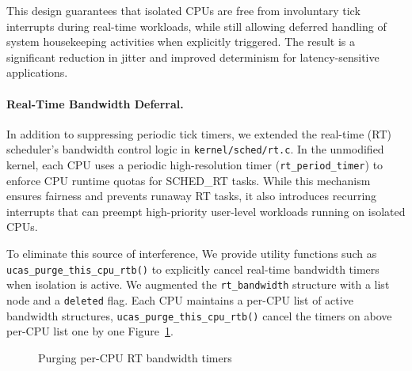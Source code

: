 \documentclass[letterpaper]{article}
\begin{document}
This design guarantees that isolated CPUs are free from involuntary tick 
interrupts during real-time workloads, while still allowing deferred handling 
of system housekeeping activities when explicitly triggered. The result is a 
significant reduction in jitter and improved determinism for 
latency-sensitive applications.

\paragraph{Real-Time Bandwidth Deferral.}
In addition to suppressing periodic tick timers, we extended the real-time (RT) 
scheduler’s bandwidth control logic in \texttt{kernel/sched/rt.c}. In the 
unmodified kernel, each CPU uses a periodic high-resolution timer 
(\texttt{rt\_period\_timer}) to enforce CPU runtime quotas for SCHED\_RT tasks. 
While this mechanism ensures fairness and prevents runaway RT tasks, it also 
introduces recurring interrupts that can preempt high-priority user-level 
workloads running on isolated CPUs.

To eliminate this source of interference, 
We provide utility functions such as 
\texttt{ucas\_purge\_this\_cpu\_rtb()} to explicitly cancel real-time bandwidth timers when 
isolation is active. We augmented the \texttt{rt\_bandwidth} 
structure with a list node and a \texttt{deleted} flag. Each CPU maintains a 
per-CPU list of active bandwidth structures, \texttt{ucas\_purge\_this\_cpu\_rtb()} cancel
the timers on above per-CPU list one by one Figure~\ref{fig:purge_flowchart}.

\begin{figure}[h]
\centering
{}
\caption{Purging per-CPU RT bandwidth timers}
\label{fig:purge_flowchart}
\end{figure}
\end{document}
